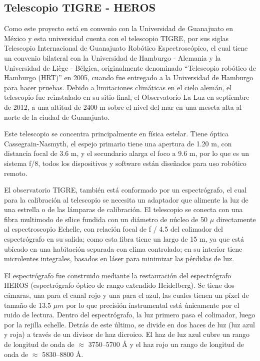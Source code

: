 \documentclass[12pt,oneside,openany,letter]{book}
\begin{document}
\subsection{Telescopio TIGRE - HEROS}

Como este proyecto está en convenio con la Universidad de Guanajuato en México y esta universidad cuenta con el telescopio TIGRE, por sus siglas Telescopio Internacional de Guanajuato Robótico Espectroscópico, el cual tiene un convenio bilateral con la Universidad de Hamburgo - Alemania y la Universidad de Liège - Bélgica, originalmente denominado ``Telescopio robótico de Hamburgo (HRT)'' en 2005, cuando fue entregado a la Universidad de Hamburgo para hacer pruebas.  Debido a limitaciones climáticas en el cielo alemán, el telescopio fue reinstalado en su sitio final, el Observatorio La Luz en septiembre de 2012, a una altitud de 2400 m sobre el nivel del mar en una meseta alta al norte de la ciudad de Guanajuato.

\noindent Este telescopio se concentra principalmente en física estelar. Tiene óptica Cassegrain-Nasmyth, el espejo primario tiene una apertura de 1.20 m, con distancia focal de 3.6 m, y el secundario alarga el foco a 9.6 m, por lo que es un sistema f/8, todos los dispositivos y software están diseñados para uso robótico remoto.

\noindent El observatorio TIGRE, también está conformado por un espectrógrafo, el cual para la calibración al telescopio se necesita un adaptador que alimente la luz de una estrella o de las lámparas de calibración. El telescopio se conecta con una fibra multimodo de sílice fundida con un diámetro de núcleo de 50 $\mu $ directamente al espectroscopio Echelle, con relación focal de f / 4.5 del colimador del espectrógrafo en su salida; como esta fibra tiene un largo de 15 m, ya que está ubicado en una habitación separada con clima controlado;  en su interior tiene microlentes integrales, basados en láser para minimizar las pérdidas de luz.

\noindent El espectrógrafo fue construido mediante la restauración del espectrógrafo HEROS (espectrógrafo óptico de rango extendido Heidelberg). Se tiene dos cámaras, una para el canal rojo y una para el azul, las cuales tienen un píxel de tamaño de 13.5 $\mu m$ por lo que precisión instrumental está únicamente por el ruido de lectura. Dentro del espectrógrafo, la luz primero pasa el colimador, luego por la rejilla echelle. Detrás de este último, se divide en dos haces de luz (luz azul y roja) a través de un divisor de haz dicroico.  El haz de luz azul cubre un rango de longitud de onda de $\approx$ 3750–5700 \r{A} y el haz rojo un rango de longitud de onda de $\approx$ 5830–8800 \r{A}.
\end{document}
